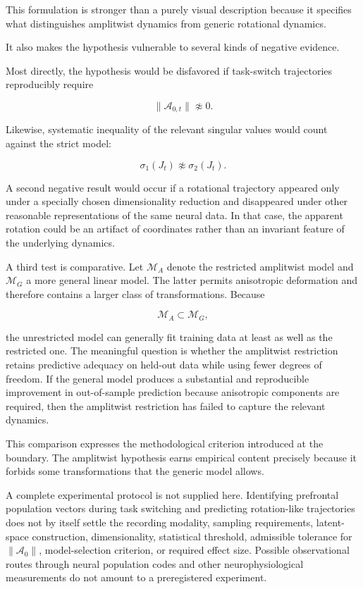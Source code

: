 \documentclass[11pt]{article}
\begin{document}
This formulation is stronger than a purely visual description because it specifies what distinguishes amplitwist dynamics from generic rotational dynamics.

It also makes the hypothesis vulnerable to several kinds of negative evidence.

Most directly, the hypothesis would be disfavored if task-switch trajectories reproducibly require

\begin{equation}
\|\mathcal A_{0,t}\|
\not\approx0.
\end{equation}

Likewise, systematic inequality of the relevant singular values would count against the strict model:

\begin{equation}
\sigma_1(J_t)
\not\approx
\sigma_2(J_t).
\end{equation}

A second negative result would occur if a rotational trajectory appeared only under a specially chosen dimensionality reduction and disappeared under other reasonable representations of the same neural data. In that case, the apparent rotation could be an artifact of coordinates rather than an invariant feature of the underlying dynamics.

A third test is comparative. Let $\mathcal M_A$ denote the restricted amplitwist model and $\mathcal M_G$ a more general linear model. The latter permits anisotropic deformation and therefore contains a larger class of transformations. Because

\begin{equation}
\mathcal M_A\subset\mathcal M_G,
\end{equation}

the unrestricted model can generally fit training data at least as well as the restricted one. The meaningful question is whether the amplitwist restriction retains predictive adequacy on held-out data while using fewer degrees of freedom. If the general model produces a substantial and reproducible improvement in out-of-sample prediction because anisotropic components are required, then the amplitwist restriction has failed to capture the relevant dynamics.

This comparison expresses the methodological criterion introduced at the boundary. The amplitwist hypothesis earns empirical content precisely because it forbids some transformations that the generic model allows.

A complete experimental protocol is not supplied here. Identifying prefrontal population vectors during task switching and predicting rotation-like trajectories does not by itself settle the recording modality, sampling requirements, latent-space construction, dimensionality, statistical threshold, admissible tolerance for $\|\mathcal A_0\|$, model-selection criterion, or required effect size. Possible observational routes through neural population codes and other neurophysiological measurements do not amount to a preregistered experiment.
\end{document}
